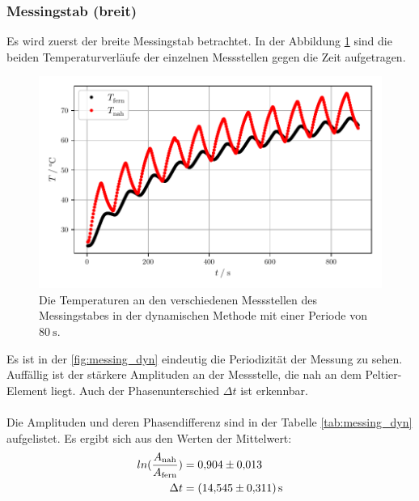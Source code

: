 \subsubsection{Messingstab (breit)}
Es wird zuerst der breite Messingstab betrachtet. 
In der Abbildung \ref{fig:messing_dyn} sind die beiden Temperaturverläufe der einzelnen Messstellen gegen die Zeit aufgetragen.
\begin{figure}[H]
  \centering
  \includegraphics{build/plot_messing.pdf}
  \caption{Die Temperaturen an den verschiedenen Messstellen des Messingstabes in der dynamischen Methode mit einer Periode von $\SI{80}{\second}$.}
  \label{fig:messing_dyn}
\end{figure}
Es ist in der \autoref{fig:messing_dyn} eindeutig die Periodizität der Messung zu sehen.
Auffällig ist der stärkere Amplituden an der Messstelle, die nah an dem Peltier-Element liegt.
Auch der Phasenunterschied $\Delta t$ ist erkennbar.\\
\\
Die Amplituden und deren Phasendifferenz sind in der Tabelle \ref{tab:messing_dyn} aufgelistet.
Es ergibt sich aus den Werten der Mittelwert:
\begin{align*}
  ln(\frac{A_{\text{nah}}}{A_{\text{fern}}}) &= \num{0.904 \pm 0.013}\\
  \Delta t &= \SI{14.545 \pm 0.311}{\second}
\end{align*} 

